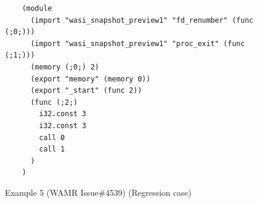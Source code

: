 \begin{figure}[!t]
    \centering
    \begin{lstlisting}
    (module
      (import "wasi_snapshot_preview1" "fd_renumber" (func (;0;)))
      (import "wasi_snapshot_preview1" "proc_exit" (func (;1;)))
      (memory (;0;) 2)
      (export "memory" (memory 0))
      (export "_start" (func 2))
      (func (;2;)
        i32.const 3
        i32.const 3
        call 0
        call 1
      )
    ) 
    \end{lstlisting}
    \caption{Example 5 (WAMR Issue\#4539) (Regression case)}
    \label{example:ex5}
\end{figure}

